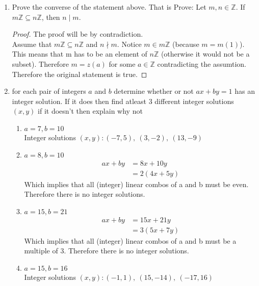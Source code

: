\documentclass{article}
\newcommand{\Z}{\mathbb{Z}}
\newcommand{\divides}{\mid}
\newcommand{\notdivides}{\nmid}
\begin{document}
\begin{enumerate}
		\item Prove the converse of the statement above. That is Prove: 
		Let $m,n \in \Z$. If $m\Z \subseteq n\Z$, then $n \divides m$.    
		\begin{proof}
			The proof will be by contradiction.\\
			Assume that $m\Z \subseteq n\Z$ and $n \notdivides m$.
			Notice $m \in m\Z$ (because $m = m(1)$). This means that m has to be an element of $n\Z$ (otherwise it would not be a subset).
			Therefore $m = z(a)$ for some $a \in \Z$ contradicting the assumtion. Therefore the original statement is true.
		\end{proof}
		\item for each pair of integers $a$ and $b$ determine whether or not $ax+by=1$ has an integer solution. If it does then find atleast 3 different integer solutions $(x,y)$ if it doesn't then explain why not
		\begin{enumerate}
			\item $a=7, b= 10$\\
				Integer solutions $(x,y): (-7, 5 ),\ (3, -2 ),\ (13, -9)$

			\item $a=8, b= 10$\\
				\begin{align*}
					ax+by &= 8x+10y\\
						  &= 2(4x+5y) 
				\end{align*}
				Which implies that all (integer) linear combos of a and b must be even. Therefore there is no integer solutions. 
			\item $a=15, b= 21$ 
			\begin{align*}
				ax+by &= 15x + 21y\\
					  &= 3(5x+7y)
			\end{align*}
			Which implies that all (integer) linear combos of a and b must be a multiple of 3. Therefore there is no integer solutions.
			\item $a=15, b= 16$ \\
			Integer solutions $(x,y): (-1,1), \  (15, -14), \ (-17, 16)$
		\end{enumerate}


	\end{enumerate}
\end{document}
